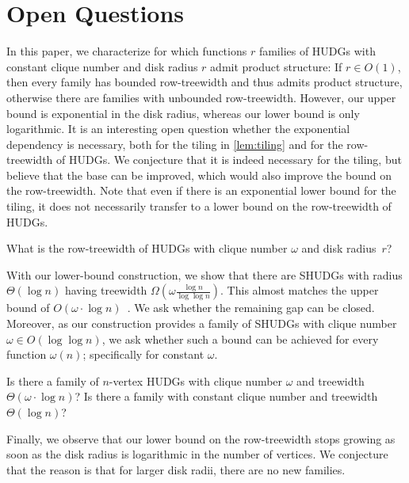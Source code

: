 \section{Open Questions}\label{sec:open}
%
In this paper, we characterize for which functions $ r $ families of HUDGs with constant clique number and disk radius $ r $ admit product structure:
If $ r \in O(1) $, then every family has bounded row-treewidth and thus admits product structure, otherwise there are families with unbounded row-treewidth.
However, our upper bound is exponential in the disk radius, whereas our lower bound is only logarithmic. 
It is an interesting open question whether the exponential dependency is necessary, both for the tiling in \cref{lem:tiling} and for the row-treewidth of HUDGs.
We conjecture that it is indeed necessary for the tiling, but believe that the base can be improved, which would also improve the bound on the row-treewidth.
Note that even if there is an exponential lower bound for the tiling, it does not necessarily transfer to a lower bound on the row-treewidth of HUDGs.
%
\begin{question}
    What is the row-treewidth of HUDGs with clique number $ \omega $ and disk radius~$ r $?
\end{question}
%
With our lower-bound construction, we show that there are SHUDGs with radius $ \Theta(\log n) $ having treewidth $ \Omega( \omega \frac{\log n}{\log \log n} ) $.
This almost matches the upper bound of $ O(\omega \cdot \log n) $~\cite{Struc_Indep_Hyper_Unifor_Disk_Graph-Blaesius25,Treew_Graph_Balan_Separ-DvoraNorin19}.
We ask whether the remaining gap can be closed.
Moreover, as our construction provides a family of SHUDGs with clique number $\omega \in O(\log \log n)$, we ask whether such a bound can be achieved for every function $\omega(n)$; specifically for constant $\omega$.
%
\begin{question}
    Is there a family of $ n $-vertex HUDGs with clique number $ \omega $ and treewidth $ \Theta(\omega \cdot \log n) $?
    Is there a family with constant clique number and treewidth $\Theta(\log n)$?
\end{question}
%
Finally, we observe that our lower bound on the row-treewidth stops growing as soon as the disk radius is logarithmic in the number of vertices.
We conjecture that the reason is that for larger disk radii, there are no new families.
%
